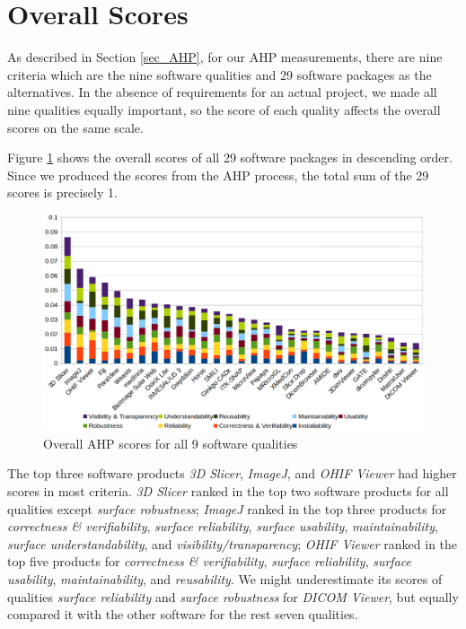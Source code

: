 \section{Overall Scores}

As described in Section \ref{sec_AHP}, for our AHP measurements, there are nine criteria which are the nine software qualities and 29 software packages as the alternatives. In the absence of requirements for an actual project, we made all nine qualities equally important, so the score of each quality affects the overall scores on the same scale.

Figure \ref{fg_overall_scores} shows the overall scores of all 29 software packages in descending order. Since we produced the scores from the AHP process, the total sum of the 29 scores is precisely 1.

\begin{figure}[H]
\includegraphics[scale=0.38]{figures/overall_scores.png}
\caption{Overall AHP scores for all 9 software qualities}

\label{fg_overall_scores}
\end{figure}

The top three software products \textit{3D Slicer}, \textit{ImageJ}, and \textit{OHIF Viewer} had higher scores in most criteria. \textit{3D Slicer} ranked in the top two software products for all qualities except \textit{surface robustness}; \textit{ImageJ} ranked in the top three products for \textit{correctness \& verifiability}, \textit{surface reliability}, \textit{surface usability}, \textit{maintainability}, \textit{ surface understandability}, and \textit{visibility/transparency}; \textit{OHIF Viewer} ranked in the top five products for \textit{correctness \& verifiability}, \textit{surface reliability}, \textit{surface usability}, \textit{maintainability}, and \textit{reusability}. We might underestimate its scores of qualities \textit{surface reliability} and \textit{surface robustness} for \textit{DICOM Viewer}, but equally compared it with the other software for the rest seven qualities.
